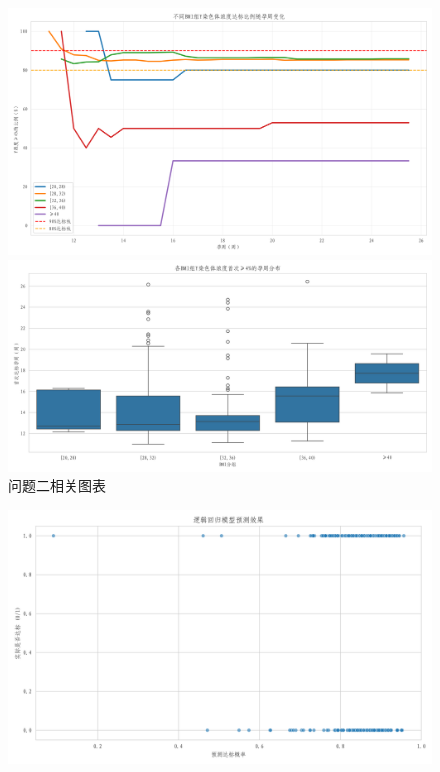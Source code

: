 \documentclass[withoutpreface,bwprint]{cumcmthesis} %
\begin{document}
\begin{appendices}
     \begin{figure}[H]
        \centering
        \begin{minipage}{0.49\textwidth}
            \centering
            \includegraphics[width=\textwidth]{../figure/C2_Output/attainment_ratio_by_bmi.png}
        \end{minipage}
        \begin{minipage}{0.49\textwidth}
            \centering
            \includegraphics[width=\textwidth]{../figure/C2_Output/first_attainment_by_bmi.png}
        \end{minipage}
        \caption{问题二相关图表}
        \label{fig:q2}
    \end{figure}
    \begin{figure}[H]
        \centering
        \begin{minipage}{0.49\textwidth}
            \centering
            \includegraphics[width=\textwidth]{../figure/C3_Output/logit_prediction_scatter.png}

\end{minipage}
\end{figure}
\end{appendices}
\end{document}
